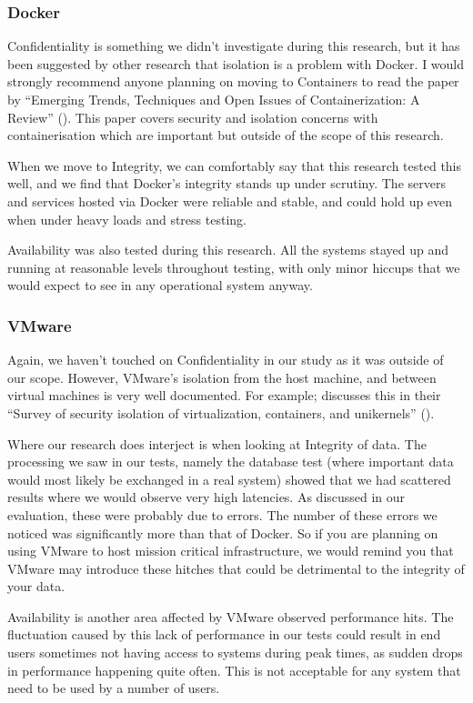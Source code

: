 \subsubsection{Docker}
Confidentiality is something we didn't investigate during this research, but it has been suggested by other research that isolation is a problem with Docker. I would strongly recommend anyone planning on moving to Containers to read the paper by \citeauthor{watanda19} ``Emerging Trends, Techniques and Open Issues of
Containerization: A Review'' (\citeyear{watanda19}). This paper covers security and isolation concerns with containerisation which are important but outside of the scope of this research.

When we move to Integrity, we can comfortably say that this research tested this well, and we find that Docker's integrity stands up under scrutiny. The servers and services hosted via Docker were reliable and stable, and could hold up even when under heavy loads and stress testing.

Availability was also tested during this research. All the systems stayed up and running at reasonable levels throughout testing, with only minor hiccups that we would expect to see in any operational system anyway.

\subsubsection{VMware}
Again, we haven't touched on Confidentiality in our study as it was outside of our scope. However, VMware's isolation from the host machine, and between virtual machines is very well documented. For example; \citeauthor{VMwareIsolation} discusses this in their ``Survey of security isolation of virtualization, containers, and unikernels'' (\citeyear{VMwareIsolation}).

Where our research does interject is when looking at Integrity of data. The processing we saw in our tests, namely the database test (where important data would most likely be exchanged in a real system) showed that we had scattered results where we would observe very high latencies. As discussed in our evaluation, these were probably due to errors. The number of these errors we noticed was significantly more than that of Docker. So if you are planning on using VMware to host mission critical infrastructure, we would remind you that VMware may introduce these hitches that could be detrimental to the integrity of your data.

Availability is another area affected by VMware observed performance hits. The fluctuation caused by this lack of performance in our tests could result in end users sometimes not having access to systems during peak times, as sudden drops in performance happening quite often. This is not acceptable for any system that need to be used by a number of users. 

